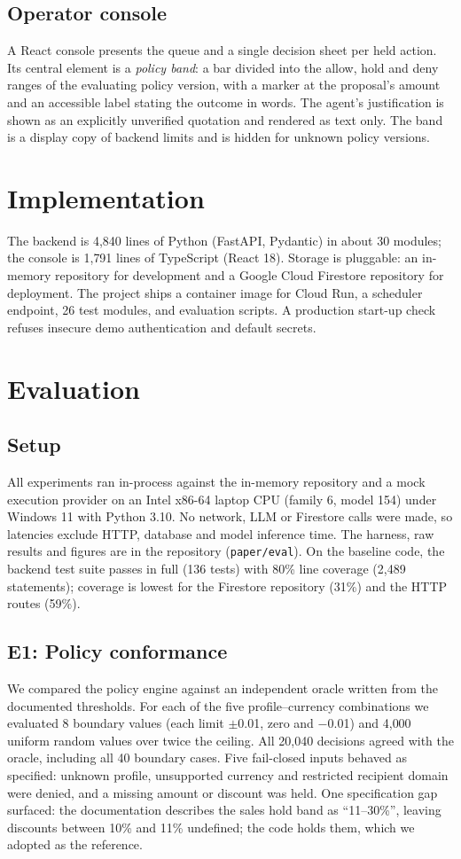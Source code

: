 \documentclass[conference]{IEEEtran}
\begin{document}
\subsection{Operator console}
A React console presents the queue and a single decision sheet per held action. Its central element is a \emph{policy band}: a bar divided into the allow, hold and deny ranges of the evaluating policy version, with a marker at the proposal's amount and an accessible label stating the outcome in words. The agent's justification is shown as an explicitly unverified quotation and rendered as text only. The band is a display copy of backend limits and is hidden for unknown policy versions.

\section{Implementation}
The backend is 4{,}840 lines of Python (FastAPI, Pydantic) in about 30 modules; the console is 1{,}791 lines of TypeScript (React 18). Storage is pluggable: an in-memory repository for development and a Google Cloud Firestore repository for deployment. The project ships a container image for Cloud Run, a scheduler endpoint, 26 test modules, and evaluation scripts. A production start-up check refuses insecure demo authentication and default secrets.

\section{Evaluation}
\subsection{Setup}
All experiments ran in-process against the in-memory repository and a mock execution provider on an Intel x86-64 laptop CPU (family 6, model 154) under Windows 11 with Python 3.10. No network, LLM or Firestore calls were made, so latencies exclude HTTP, database and model inference time. The harness, raw results and figures are in the repository (\texttt{paper/eval}). On the baseline code, the backend test suite passes in full (136 tests) with 80\% line coverage (2{,}489 statements); coverage is lowest for the Firestore repository (31\%) and the HTTP routes (59\%).

\subsection{E1: Policy conformance}
We compared the policy engine against an independent oracle written from the documented thresholds. For each of the five profile--currency combinations we evaluated 8 boundary values (each limit $\pm$0.01, zero and $-$0.01) and 4{,}000 uniform random values over twice the ceiling. All 20{,}040 decisions agreed with the oracle, including all 40 boundary cases. Five fail-closed inputs behaved as specified: unknown profile, unsupported currency and restricted recipient domain were denied, and a missing amount or discount was held. One specification gap surfaced: the documentation describes the sales hold band as ``11--30\%'', leaving discounts between 10\% and 11\% undefined; the code holds them, which we adopted as the reference.
\end{document}
